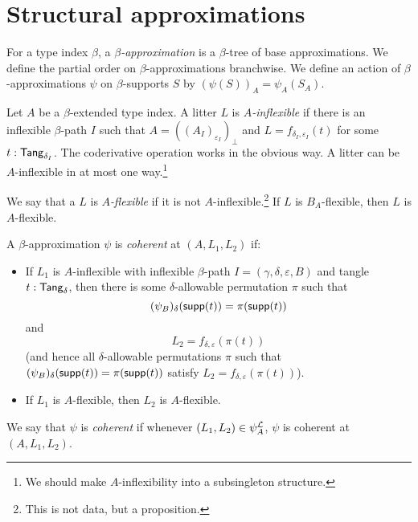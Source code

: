 \section{Structural approximations}
\begin{definition}
  \label{def:StrApprox}
  For a type index \( \beta \), a \emph{\( \beta \)-approximation} is a \( \beta \)-tree of base approximations.
  We define the partial order on \( \beta \)-approximations branchwise.
  We define an action of \( \beta \)-approximations \( \psi \) on \( \beta \)-supports \( S \) by \( (\psi(S))_A = \psi_A(S_A) \).
\end{definition}
\begin{definition}
  \label{def:Inflexible}
  Let \( A \) be a \( \beta \)-extended type index.
  A litter \( L \) is \emph{\( A \)-inflexible} if there is an inflexible \( \beta \)-path \( I \) such that \( A = ((A_I)_{\varepsilon_I})_\bot \) and \( L = f_{\delta_I, \varepsilon_I}(t) \) for some \( t : \mathsf{Tang}_{\delta_I} \).
  The coderivative operation works in the obvious way.
  A litter can be \( A \)-inflexible in at most one way.\footnote{We should make \( A \)-inflexibility into a subsingleton structure.}

  We say that a \( L \) is \emph{\( A \)-flexible} if it is not \( A \)-inflexible.\footnote{This is not data, but a proposition.}
  If \( L \) is \( B_A \)-flexible, then \( L \) is \( A \)-flexible.
\end{definition}
\begin{definition}
  \label{def:Coherent}
  A \( \beta \)-approximation \( \psi \) is \emph{coherent} at \( (A, L_1, L_2) \) if:
  \begin{itemize}
    \item If \( L_1 \) is \( A \)-inflexible with inflexible \( \beta \)-path \( I = (\gamma, \delta, \varepsilon, B) \) and tangle \( t : \mathsf{Tang}_\delta \), then there is some \( \delta \)-allowable permutation \( \pi \) such that
    \[ (\psi_B)_\delta(\operatorname{\mathsf{supp}}(t)) = \pi(\operatorname{\mathsf{supp}}(t)) \]
    and
    \[ L_2 = f_{\delta,\varepsilon}(\pi(t)) \]
    (and hence all \( \delta \)-allowable permutations \( \pi \) such that \( (\psi_B)_\delta(\operatorname{\mathsf{supp}}(t)) = \pi(\operatorname{\mathsf{supp}}(t)) \) satisfy \( L_2 = f_{\delta,\varepsilon}(\pi(t)) \)).
    \item If \( L_1 \) is \( A \)-flexible, then \( L_2 \) is \( A \)-flexible.
  \end{itemize}
  We say that \( \psi \) is \emph{coherent} if whenever \( (L_1, L_2) \in \psi_A^{\mathcal L} \), \( \psi \) is coherent at \( (A, L_1, L_2) \).
\end{definition}
